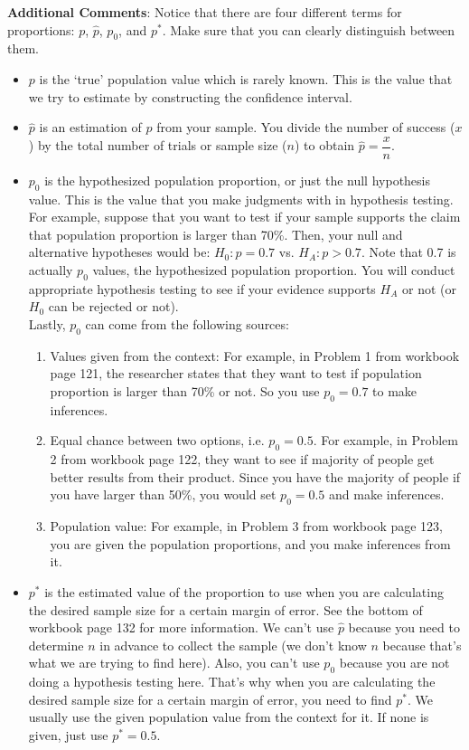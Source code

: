 \documentclass[12pt]{article}
\begin{document}
\textbf{Additional Comments}: Notice that there are four different terms for proportions: $p$, $\hat{p}$, $p_0$, and $p^*$. Make sure that you can clearly distinguish between them.
\begin{itemize}
	\item $p$ is the `true' population value which is rarely known. This is the value that we try to estimate by constructing the confidence interval.
	\item $\hat{p}$ is an estimation of $p$ from your sample. You divide the number of success ($x$) by the total number of trials or sample size ($n$) to obtain $\hat{p} = \dfrac{x}{n}$.
	\item $p_0$ is the hypothesized population proportion, or just the null hypothesis value. This is the value that you make judgments with in hypothesis testing. For example, suppose that you want to test if your sample supports the claim that population proportion is larger than 70\%. Then, your null and alternative hypotheses would be: $H_0: p = 0.7$ vs. $H_A: p > 0.7$. Note that 0.7 is actually $p_0$ values, the hypothesized population proportion. You will conduct appropriate hypothesis testing to see if your evidence supports $H_A$ or not (or $H_0$ can be rejected or not). \\
	Lastly, $p_0$ can come from the following sources:
	\begin{enumerate}
		\item Values given from the context: For example, in Problem 1 from workbook page 121, the researcher states that they want to test if population proportion is larger than 70\% or not. So you use $p_0 = 0.7$ to make inferences.
		\item Equal chance between two options, i.e. $p_0 = 0.5$. For example, in Problem 2 from workbook page 122, they want to see if majority of people get better results from their product. Since you have the majority of people if you have larger than 50\%, you would set $p_0 = 0.5$ and make inferences.
		\item Population value: For example, in Problem 3 from workbook page 123, you are given the population proportions, and you make inferences from it.
	\end{enumerate}
	\item $p^*$ is the estimated value of the proportion to use when you are calculating the desired sample size for a certain margin of error. See the bottom of workbook page 132 for more information. We can't use $\hat{p}$ because you need to determine $n$ in advance to collect the sample (we don't know $n$ because that's what we are trying to find here). Also, you can't use $p_0$ because you are not doing a hypothesis testing here. That's why when you are calculating the desired sample size for a certain margin of error, you need to find $p^*$. We usually use the given population value from the context for it. If none is given, just use $p^* = 0.5$.
\end{itemize}
\end{document}
